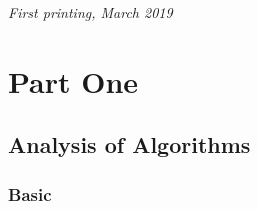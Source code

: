 \documentclass[11pt,fleqn]{book}
\begin{document}
\noindent \textit{First printing, March 2019} %




\pagestyle{empty} %

\tableofcontents %

\cleardoublepage %

\pagestyle{fancy} %


\part{Part One}


\chapter{Analysis of Algorithms }
\vspace{1em}
\section{Basic}
\end{document}
